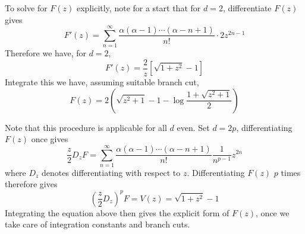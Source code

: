\documentclass{report}
\begin{document}
To solve for $F(z)$ explicitly, note for a start that for $d=2$, differentiate $F(z)$ gives
\begin{equation}
  F'(z)=\sum_{n=1}^\infty\frac{\alpha(\alpha-1)\cdots(\alpha-n+1)}{n!} \cdot 2 z^{2n-1}
\end{equation}
Therefore we have, for $d=2$,
\begin{equation}
  F'(z)=\frac{2}{z}\left[\sqrt{1+z^2}-1\right]
\end{equation}
Integrate this we have, assuming suitable branch cut,
\begin{equation}
  F(z) = 2 \left(\sqrt{z^2+1}-1-\log \frac{1+\sqrt{z^2+1}}{2}\right)
\end{equation}

Note that this procedure is applicable for all $d$ even. Set $d=2p$, differentiating $F(z)$ once gives
\begin{equation}
  \frac{z}{2}D_z F = \sum_{n=1}^\infty\frac{\alpha(\alpha-1)\cdots(\alpha-n+1)}{n!} \frac{1}{n^{p-1}} z^{2n}
\end{equation}
where $D_z$ denotes differentiating with respect to $z$. Differentiating $F(z)$ $p$ times therefore gives
\begin{equation}
  \left(\frac{z}{2}D_z\right)^p F = V(z) = \sqrt{1+z^2}-1
\end{equation}
Integrating the equation above then gives the explicit form of $F(z)$, once we take care of integration constants and branch cuts.
\end{document}
